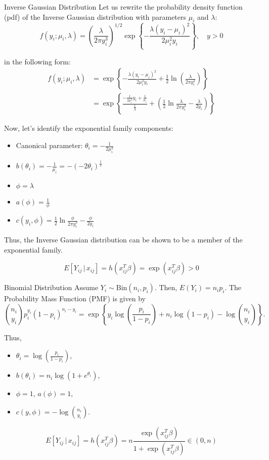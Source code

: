 \documentclass[UTF8,a4paper,10pt]{article}
\begin{document}
\begin{mybox}{Inverse Gaussian Distribution}
  Let us rewrite the probability density function (pdf) of the Inverse Gaussian distribution with parameters $\mu_i$ and $\lambda$:
  \[
  f(y_i; \mu_i, \lambda) = \left(\frac{\lambda}{2\pi y_i^3}\right)^{1/2}\exp\left\{-\frac{\lambda(y_i - \mu_i)^2}{2\mu_i^2 y_i}\right\}, \quad y > 0
  \]
  
  in the following form:
  \[
  \begin{aligned}
  f(y_i; \mu_i, \lambda) &= \exp\left\{-\frac{\lambda(y_i - \mu_i)^2}{2\mu_i^2 y_i} + \frac{1}{2}\ln\left(\frac{\lambda}{2\pi y_i^3}\right)\right\} \\
  &=\exp\left\{\frac{-\frac{1}{2\mu_i^2}y_i+\frac{1}{\mu_i}}{\frac{1}{\lambda}}+\left(\frac{1}{2}\ln \frac{\lambda}{2\pi y_i^3}-\frac{\lambda}{2y_i}\right) \right\}
  \end{aligned}
  \]
  
  Now, let's identify the exponential family components:
  \begin{itemize}
      \item Canonical parameter: $\theta_i = -\frac{1}{2\mu_i^2}$
      \item $b(\theta_i) = -\frac{1}{\mu_i} = -(-2\theta_i)^{\frac{1}{2}} $
      \item $\phi = \lambda$
      \item \(a(\phi) = \frac{1}{\phi}\)
      \item \(c(y_i,\phi) = \frac{1}{2}\ln\frac{\phi}{2\pi y_i^{3}}-\frac{\phi}{2y_i}\)
  \end{itemize}
  
  Thus, the Inverse Gaussian distribution can be shown to be a member of the exponential family.

  \[E[Y_{ij}\,|\, x_{ij}] = h(x_{ij}^T\beta) = \exp(x_{ij}^T\beta)>0\]

\end{mybox}
  
  
\begin{mybox}{Binomial Distribution}
Assume $Y_i \sim \text{Bin}(n_i, p_i)$. Then, $E(Y_i) = n_i p_i$. The Probability Mass Function (PMF) is given by
\[
\binom{n_i}{y_i} p_i^{y_i} (1 - p_i)^{n_i - y_i} = \exp\left\{y_i \log \left(\frac{p_i}{1 - p_i}\right) + n_i \log(1 - p_i) - \log \binom{n_i}{y_i}\right\}.
\]

Thus, 
\begin{itemize}
  \item $\theta_i = \log\left(\frac{p_i}{1 - p_i}\right)$, 
  \item $b(\theta_i) = n_i \log(1 + e^{\theta_i})$, 
  \item $\phi = 1$, $a(\phi) = 1$,
  \item $c(y, \phi) = -\log \binom{n_i}{y_i}$.
\end{itemize}

\[E[Y_{ij}\,|\, x_{ij}] = h(x_{ij}^T\beta) = n \frac{\exp(x_{ij}^T\beta)}{1+\exp(x_{ij}^T\beta)}\in (0,n)\]

\end{mybox}
\end{document}
